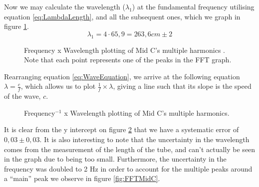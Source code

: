 \documentclass{article}
\begin{document}
Now we may calculate the wavelength ($\lambda_1$) at the fundamental frequency utilising equation \ref{eq:LambdaLength}, and all the subsequent ones, which we graph in figure \ref{gr:MidC_FrequencyByWavelength}. 
$$\lambda_1 = 4 \cdot 65,9 = 263,6 cm \pm 2 $$

\begin{figure}[h!]
	\caption{Frequency x Wavelength plotting of Mid C's multiple harmonics . Note that each point represents one of the peaks in the FFT graph.}
	\label{gr:MidC_FrequencyByWavelength}
\end{figure}

Rearranging equation \ref{eq:WaveEquation}, we arrive at the following equation $\lambda = \frac{c}{f}$, which allows us to plot $\frac{1}{f} \times \lambda$, giving a line such that its slope is the speed of the wave, $c$.

\begin{figure}[h!]
	\caption{Frequency$^{-1}$ x Wavelength plotting of Mid C's multiple harmonics.}
	\label{gr:MidC_1/FrequencyByWavelength}
\end{figure}
It is clear from the y intercept on figure \ref{gr:MidC_1/FrequencyByWavelength} that we have a systematic error of $0,03 \pm 0,03$. It is also interesting to note that the uncertainty in the wavelength comes from the measurement of the length of the tube, and can't actually be seen in the graph due to being too small. Furthermore, the uncertainty in the frequency was doubled to 2 Hz in order to account for the multiple peaks around a ``main'' peak we observe in figure \ref{fig:FFTMidC}.
\end{document}

